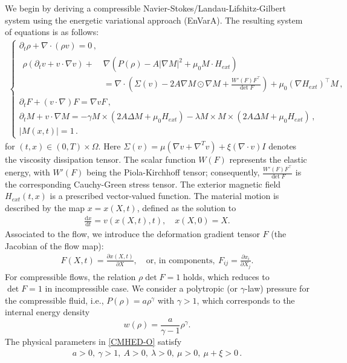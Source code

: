 \documentclass[reqno,11pt]{amsart}
\numberwithin{equation}{section}
\def\p{\partial}
\def\d{\mathrm{d}}
\begin{document}
We begin by deriving a compressible Navier-Stokes/Landau-Lifshitz-Gilbert system using the energetic variational approach (EnVarA). The resulting system of equations is as follows:
\begin{align}\label{CMHED-O}
\begin{cases}
  \p_t \rho + \nabla \cdot (\rho v) = 0 \,, \\
  \begin{aligned}
    \rho (\p_t v + v \cdot \nabla v) +\; & \nabla \left( P (\rho) - A |\nabla M|^2 + \mu_0 M \cdot H_{ext} \right) 
    \\[5pt] & 
    = \nabla \cdot \left( \Sigma (v) - 2 A \nabla M \odot \nabla M + \tfrac{W'(F)F^\top}{\det F} \right) + \mu_0 (\nabla H_{ext})^\top M \,, 
  \end{aligned} \\
  \partial_t F + (v \cdot \nabla) F = \nabla v F \,, \\
  \p_t M + v \cdot \nabla M = - \gamma M \times (2 A \Delta M + \mu_0 H_{ext}) - \lambda M \times M \times (2 A \Delta M + \mu_0 H_{ext}) \,, \\ 
  |M(x,t)| = 1 \,. 
\end{cases}
\end{align}
for $(t,x) \in (0, T) \times \Omega $. Here $\Sigma (v) = \mu (\nabla v + \nabla^T v) + \xi (\nabla \cdot v) I$ denotes the viscosity dissipation tensor. The scalar function $W (F)$ represents the elastic energy, with $W' (F)$ being the Piola-Kirchhoff tensor; consequently, $\frac{W' (F) F^\top}{\det F}$ is the corresponding Cauchy-Green stress tensor. The exterior magnetic field $H_{ext} (t,x)$ is a prescribed vector-valued function. The material motion is described by the map $x = x (X, t)$, defined as the solution to
\begin{equation}\label{FM-x}
  \begin{aligned}
    \frac{\d x}{\d t} = v (x(X,t),t), \quad x (X,0)=X.
  \end{aligned}
\end{equation}
Associated to the flow, we introduce the deformation gradient tensor $F$ (the Jacobian of the flow map):
  \begin{align}
    F(X,t)= \frac{\p x(X,t)}{\p X}, \quad \text{or, in components},\ F_{ij} = \frac{\p x_i}{\p X_j}.
  \end{align}
For compressible flows, the relation $\rho \det F=1$ holds, which reduces to $\det F=1$ in incompressible case. We consider a polytropic (or $\gamma$-law) pressure for the compressible fluid, i.e., $P(\rho) = a \rho^\gamma $ with $\gamma >1$, which corresponds to the internal energy density $$w(\rho) = \frac{a}{\gamma -1} \rho^\gamma .$$
The physical parameters in \eqref{CMHED-O} satisfy 
    \begin{equation*}
        \begin{aligned}
            a > 0, \ \gamma > 1, \ A > 0, \ \lambda > 0, \ \mu > 0, \ \mu + \xi > 0 \,.
        \end{aligned}
    \end{equation*}
\end{document}
